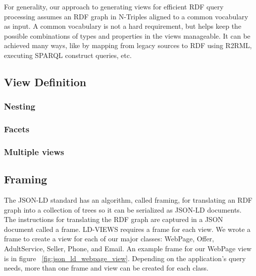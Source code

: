 For generality, our approach to generating views for efficient RDF query processing assumes an RDF graph in N-Triples aligned to a common vocabulary as input.  
A common vocabulary is not a hard requirement, but helps keep the possible combinations of types and properties in the views manageable.
It can be achieved many ways, like by mapping from legacy sources to RDF using R2RML, executing SPARQL construct queries, etc. 


\subsection{View Definition}
\subsubsection{Nesting}
\subsubsection{Facets}
\subsubsection{Multiple views}

\subsection{Framing}
The JSON-LD standard has an algorithm, called framing, for translating an RDF graph into a collection of trees so it can be serialized as JSON-LD documents. \cite{sporny:jsonld-framing}
The instructions for translating the RDF graph are captured in a JSON document called a frame.  
LD-VIEWS requires a frame for each view.  
We wrote a frame to create a view for each of our major classes: WebPage, Offer, AdultService, Seller, Phone, and Email.  
An example frame for our WebPage view is in figure ~\ref{fig:json_ld_webpage_view}.  
Depending on the application's query needs, more than one frame and view can be created for each class.  

